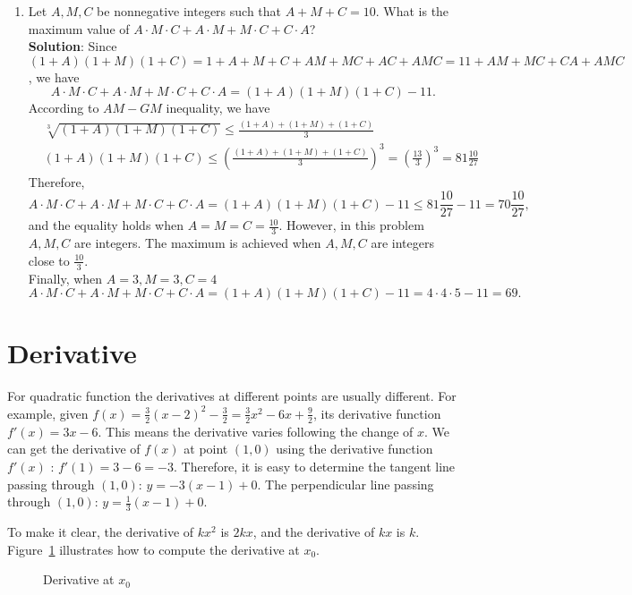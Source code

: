 \documentclass[11pt, oneside]{article}   	%
\begin{document}
\begin{enumerate}
\item
Let $A, M, C$ be nonnegative integers such that $A+M+C=10$. What is the maximum value of $A \cdot M \cdot C + A\cdot M + M \cdot C +C \cdot A$?\\
\textbf{Solution}: 
Since $(1+A)(1+M)(1+C)=1+A+M+C+AM+MC+AC+AMC=11+AM+MC+CA+AMC$, we have 
\[A \cdot M \cdot C + A\cdot M + M \cdot C +C \cdot A=(1+A)(1+M)(1+C)-11.\]
According to $AM-GM$ inequality, we have 
\begin{align*}
&\sqrt[3]{(1+A)(1+M)(1+C)}\le \frac{(1+A)+(1+M)+(1+C)}{3} \\
&(1+A)(1+M)(1+C)\le \left(\frac{(1+A)+(1+M)+(1+C)}{3}\right)^3 = \left(\frac{13}{3}\right)^3 = 81 \frac{10}{27}
\end{align*}
Therefore,
\[A \cdot M \cdot C + A\cdot M + M \cdot C +C \cdot A=(1+A)(1+M)(1+C)-11 \le  81 \frac{10}{27} - 11 =70\frac{10}{27},\]
and the equality holds when $A=M=C=\frac{10}{3}$.
However, in this problem $A, M, C$ are integers. The maximum is achieved when $A, M, C$ are integers close to $\frac{10}{3}$.\\
Finally, when $ A=3, M=3, C=4$ 
\[A \cdot M \cdot C + A\cdot M + M \cdot C +C \cdot A=(1+A)(1+M)(1+C)-11 = 4 \cdot 4 \cdot 5 -11 = 69. \]
\end{enumerate}




\newpage
\section{Derivative}
For quadratic function the derivatives at different points are usually different. For example, given $f(x)=\frac{3}{2}(x-2)^2-\frac{3}{2}=\frac{3}{2}x^2-6x+\frac{9}{2}$, its derivative function $f'(x)=3x-6$. This means the derivative varies following the change of $x$. We can get the derivative of $f(x)$ at point $(1,0)$ using the derivative function $f'(x)$ : $f'(1)=3-6=-3$. Therefore, it is easy to determine the tangent line passing through $(1,0)$: $y=-3(x-1)+0$. The perpendicular line passing through $(1,0)$: $y=\frac{1}{3}(x-1)+0$. 

To make it clear, the derivative of $kx^2$ is $2kx$, and the derivative of $kx$ is $k$.  Figure~\ref{fig:derivative} illustrates how to compute the derivative at $x_0$.
\begin{figure}
\centering
{}
\caption{Derivative at $x_0$}
\label{fig:derivative}
\end{figure}
\end{document}

